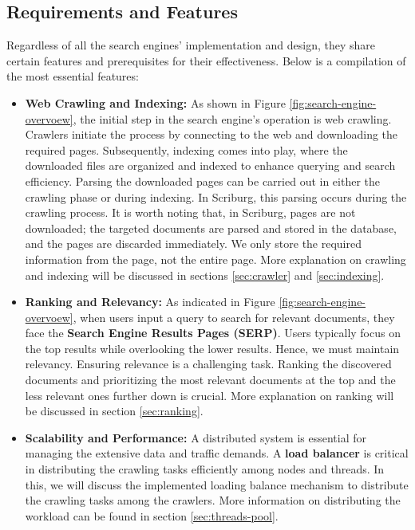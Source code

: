 \subsection{Requirements and Features}
Regardless of all the search engines' implementation and design, they share certain features and prerequisites for their effectiveness. Below is a compilation of the most essential features: 

\begin{itemize}
	\item[] \textbf{Web Crawling and Indexing:} As shown in Figure \ref{fig:search-engine-overvoew}, the initial step in the search engine's operation is web crawling. Crawlers initiate the process by connecting to the web and downloading the required pages. Subsequently, indexing comes into play, where the downloaded files are organized and indexed to enhance querying and search efficiency. Parsing the downloaded pages can be carried out in either the crawling phase or during indexing. In Scriburg, this parsing occurs during the crawling process. It is worth noting that, in Scriburg, pages are not downloaded; the targeted documents are parsed and stored in the database, and the pages are discarded immediately. We only store the required information from the page, not the entire page. More explanation on crawling and indexing will be discussed in sections \ref{sec:crawler} and \ref{sec:indexing}.
  
  \item[] \textbf{Ranking and Relevancy:} As indicated in Figure \ref{fig:search-engine-overvoew}, when users input a query to search for relevant documents, they face the \textbf{Search Engine Results Pages (SERP)}. Users typically focus on the top results while overlooking the lower results. Hence, we must maintain relevancy. Ensuring relevance is a challenging task. Ranking the discovered documents and prioritizing the most relevant documents at the top and the less relevant ones further down is crucial. More explanation on ranking will be discussed in section \ref{sec:ranking}.
  
  \item[] \textbf{Scalability and Performance:} A distributed system is essential for managing the extensive data and traffic demands. A \textbf{load balancer} is critical in distributing the crawling tasks efficiently among nodes and threads. In this, we will discuss the implemented loading balance mechanism to distribute the crawling tasks among the crawlers. More information on distributing the workload can be found in section \ref{sec:threads-pool}.

\end{itemize}

